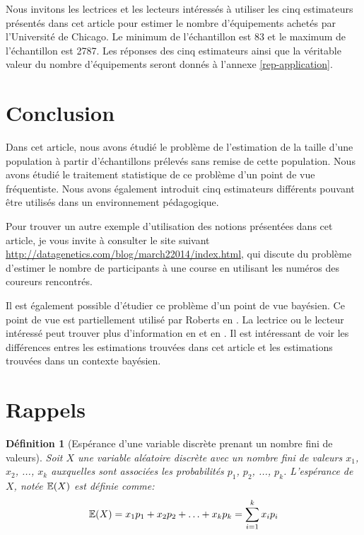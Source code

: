 \documentclass[10pt]{article}
\newtheorem{definition}{Définition}
\begin{document}
Nous invitons les lectrices et les lecteurs intéressés à utiliser les
cinq estimateurs présentés dans cet article pour estimer le nombre
d'équipements achetés par l'Université de Chicago. Le minimum de
l'échantillon est 83 et le maximum de l'échantillon est 2787. Les
réponses des cinq estimateurs ainsi que la véritable valeur du nombre
d'équipements seront donnés à l'annexe \ref{rep-application}.

\hypertarget{conclusion}{%
\section{\texorpdfstring{Conclusion
\label{conclusion}}{Conclusion }}\label{conclusion}}

Dans cet article, nous avons étudié le problème de l'estimation de la
taille d'une population à partir d'échantillons prélevés sans remise de
cette population. Nous avons étudié le traitement statistique de ce
problème d'un point de vue fréquentiste. Nous avons également introduit
cinq estimateurs différents pouvant être utilisés dans un environnement
pédagogique.

Pour trouver un autre exemple d'utilisation des notions présentées dans
cet article, je vous invite à consulter le site suivant
\url{http://datagenetics.com/blog/march22014/index.html}, qui discute du
problème d'estimer le nombre de participants à une course en utilisant
les numéros des coureurs rencontrés.

Il est également possible d'étudier ce problème d'un point de vue
bayésien. Ce point de vue est partiellement utilisé par Roberts en
\cite{Roberts1967}. La lectrice ou le lecteur intéressé peut trouver
plus d'information en \cite{Hohle2006} et en \cite{WikiGermanTank}. Il
est intéressant de voir les différences entres les estimations trouvées
dans cet article et les estimations trouvées dans un contexte bayésien.

\appendix

\hypertarget{rappels}{%
\section{\texorpdfstring{Rappels
\label{rappel_esperance}}{Rappels }}\label{rappels}}

\begin{definition}[Espérance d'une variable discrète prenant un nombre fini de valeurs]
Soit $X$ une variable aléatoire discrète avec un nombre fini de valeurs $x_1$, $x_2$, ..., $x_k$ auxquelles sont associées les probabilités $p_1$, $p_2$, ..., $p_k$. L'espérance de $X$, notée $\operatorname{\mathbb{E}} (X)$ est définie comme:
$$ \operatorname{\mathbb{E}} (X) = x_1p_1+x_2p_2+\ldots +x_kp_k = \sum_{i=1}^k x_i p_i $$
\end{definition}
\end{document}
